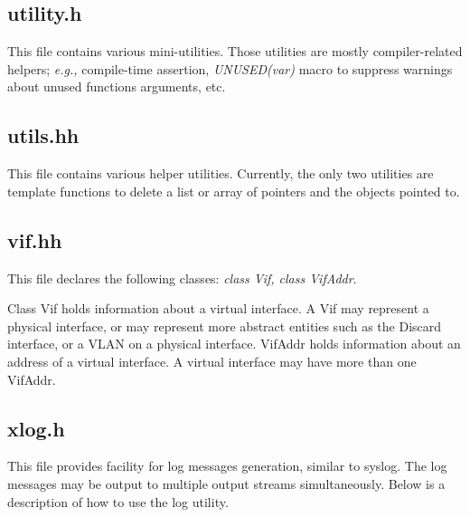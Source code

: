 \documentclass[11pt]{article}
\newcommand{\eg}{\emph{e.g.,}\xspace}
\begin{document}
\subsection{utility.h}

This file contains various mini-utilities.  Those utilities are mostly
compiler-related helpers; \eg compile-time assertion, \emph{UNUSED(var)}
macro to suppress warnings about unused functions arguments, etc.

\subsection{utils.hh}

This file contains various helper utilities. Currently, the only two
utilities are template functions to delete a list or array
of pointers and the objects pointed to. 

\subsection{vif.hh}

This file declares the following classes: \emph{class Vif, class
VifAddr}.

Class Vif holds information about a virtual interface.  A Vif may
represent a physical interface, or may represent more abstract
entities such as the Discard interface, or a VLAN on a physical
interface.
VifAddr holds information about an address of a virtual interface.
A virtual interface may have more than one VifAddr.

\subsection{xlog.h}

This file provides facility for log messages generation, similar to
syslog. The log messages may be output to multiple output streams
simultaneously. Below is a description of how to use the log utility.
\end{document}
